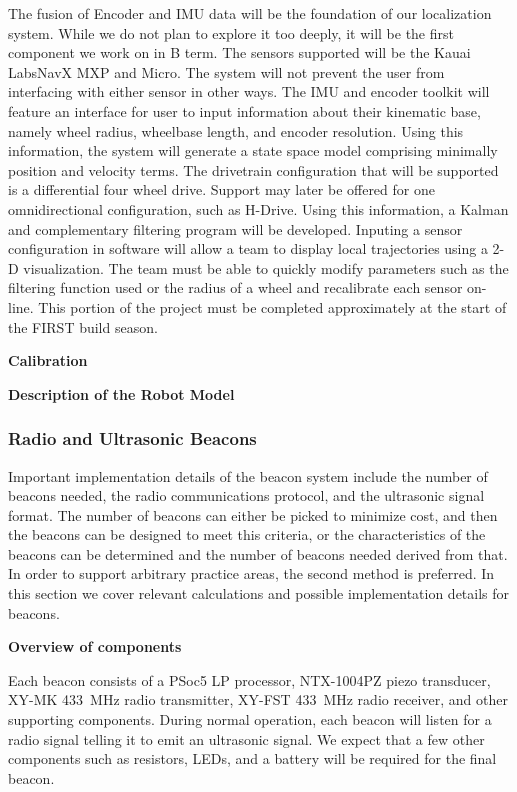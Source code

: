 \documentclass{article}
\begin{document}
      The fusion of Encoder and IMU data will be the foundation of our localization system. While we do not plan to explore it too deeply, it will be the first component we work on in B term. The sensors supported will be the Kauai Labs\texttrademark NavX MXP and Micro. The system will not prevent the user from interfacing with either sensor in other ways. The IMU and encoder toolkit will feature an interface for user to input information about their kinematic base, namely wheel radius, wheelbase length, and encoder resolution. Using this information, the system will generate a state space model comprising minimally position and velocity terms. The drivetrain configuration that will be supported is a differential four wheel drive. Support may later be offered for one omnidirectional configuration, such as H-Drive. Using this information, a Kalman and complementary filtering program will be developed. Inputing a sensor configuration in software will allow a team to display local trajectories using a 2-D visualization. The team must be able to quickly modify parameters such as the filtering function used or the radius of a wheel and recalibrate each sensor on-line. This portion of the project must be completed approximately at the start of the FIRST build season.



      \textbf{Calibration}

      \textbf{Description of the Robot Model}


    \subsubsection{Radio and Ultrasonic Beacons}

      Important implementation details of the beacon system include the number of beacons needed, the radio communications protocol, and the ultrasonic signal format. The number of beacons can either be picked to minimize cost, and then the beacons can be designed to meet this criteria, or the characteristics of the beacons can be determined and the number of beacons needed derived from that. In order to support arbitrary practice areas, the second method is preferred. In this section we cover relevant calculations and possible implementation details for beacons.

      \textbf{Overview of components}

      Each beacon consists of a PSoc5 LP processor, NTX-1004PZ piezo transducer, XY-MK \SI{433}{\mega\hertz} radio transmitter, XY-FST \SI{433}{\mega\hertz} radio receiver, and other supporting components. During normal operation, each beacon will listen for a radio signal telling it to emit an ultrasonic signal. We expect that a few other components such as resistors, LEDs, and a battery will be required for the final beacon.
\end{document}
